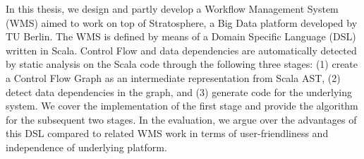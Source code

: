 % 
% 
%
In this thesis, we design and partly develop a Workflow Management System (WMS) aimed to work on top of Stratosphere, a Big Data platform developed by TU Berlin. The WMS is defined by means of a Domain Specific Language (DSL) written in Scala. Control Flow and data dependencies are automatically detected by static analysis on the Scala code through the following three stages: (1) create a Control Flow Graph as an intermediate representation from Scala AST, (2) detect data dependencies in the graph, and (3) generate code for the underlying system. We cover the implementation of the first stage and provide the algorithm for the subsequent two stages. In the evaluation, we argue over the advantages of this DSL compared to related WMS work in terms of user-friendliness and independence of underlying platform.
